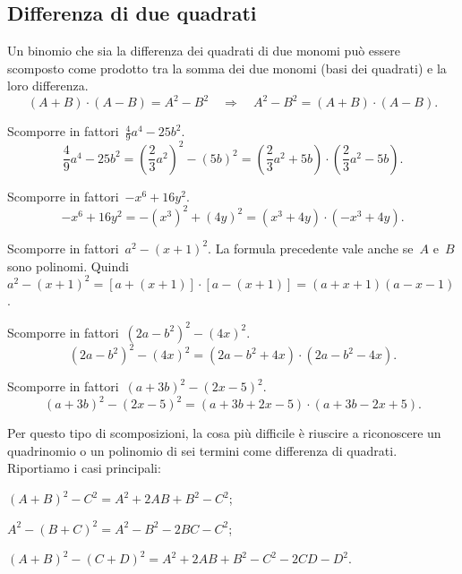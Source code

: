 \subsection{Differenza di due quadrati}
Un binomio che sia la differenza dei quadrati di due monomi può essere scomposto come prodotto tra la somma dei due monomi
(basi dei quadrati) e la loro differenza. %
\begin{equation*}
(A+B)\cdot (A-B)=A^{2}-B^{2}\quad \Rightarrow \quad A^{2}-B^{2}=(A+B)\cdot (A-B).
\end{equation*}

\begin{exrig}
 \begin{esempio}
Scomporre in fattori~$\frac{4}{9}a^{4}-25b^{2}$.
\[\frac{4}{9}a^{4}-25b^{2}=\left(\frac{2}{3}a^{2}\right)^{2}-\left(5b\right)^{2}=\left(\frac{2}{3}a^{2}+5b\right)
\cdot \left(\frac{2}{3}a^{{2}}-5b\right).\]
 \end{esempio}

 \begin{esempio}
Scomporre in fattori~$-x^{6}+16y^{2}$.
\[-x^{6}+16y^{2}=-\left(x^{3}\right)^{2}+\left(4y\right)^{2}=\left(x^{3}+4y\right)\cdot \left(-x^{3}+4y\right).\]
 \end{esempio}

 \begin{esempio}
Scomporre in fattori~$a^{2}-\left(x+1\right)^{2}$.
La formula precedente vale anche se~$A$ e~$B$ sono polinomi. Quindi $a^{2}-\left(x+1\right)^{2}=\left[a+(x+1)\right]\cdot \left[a-(x+1)\right]=(a+x+1)(a-x-1)$.
\end{esempio}

 \begin{esempio}
Scomporre in fattori~$\left(2a-b^{2}\right)^{2}-(4x)^{2}$.
\[\left(2a-b^{2}\right)^{2}-(4x)^{2}=\left(2a-b^{2}+4x\right)\cdot \left(2a-b^{2}-4x\right).\]
 \end{esempio}

 \begin{esempio}
Scomporre in fattori~$(a+3b)^{2}-(2x-5)^{2}$.
\[(a+3b)^{2}-(2x-5)^{2}=(a+3b+2x-5)\cdot (a+3b-2x+5).\]
 \end{esempio}
\end{exrig}

Per questo tipo di scomposizioni, la cosa più difficile è riuscire a riconoscere un quadrinomio o un polinomio
di sei termini come differenza di quadrati. Riportiamo i casi principali:
\begin{itemize*}
 \item $(A+B)^{2}-C^{2}=A^{{2}}+2AB+B^{2}-C^{2}$;
 \item $A^{2}-(B+C)^{2}=A^{2}-B^{2}-2BC-C^{2}$;
 \item $(A+B)^{2}-(C+D)^{2}=A^{2}+2AB+B^{2}-C^{2}-2CD-D^{2}$.
\end{itemize*}

